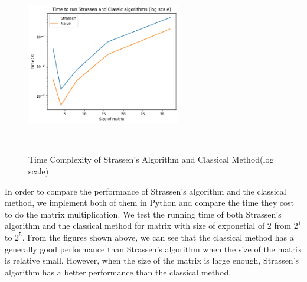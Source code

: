 \documentclass{article}
\begin{document}
\begin{figure}[htbp]
    \centering
    \includegraphics[width=0.6\textwidth, height=7.8cm]{figs/log_time_2.png}
    \caption{Time Complexity of Strassen's Algorithm and Classical Method(log scale)}
\end{figure}
In order to compare the performance of Strassen's algorithm and the classical method, we implement both of them in Python and compare the time they cost to do the matrix multiplication.
We test the running time of both Strassen's algorithm and the classical method for matrix with size of exponetial of $2$ from $2^1$ to $2^{5}$. From the figures shown above, we can see that the classical method
has a generally good performance than Strassen's algorithm when the size of the matrix is relative small. However, when the size of the matrix is large enough, Strassen's algorithm has a better performance than the classical method.
\end{document}
